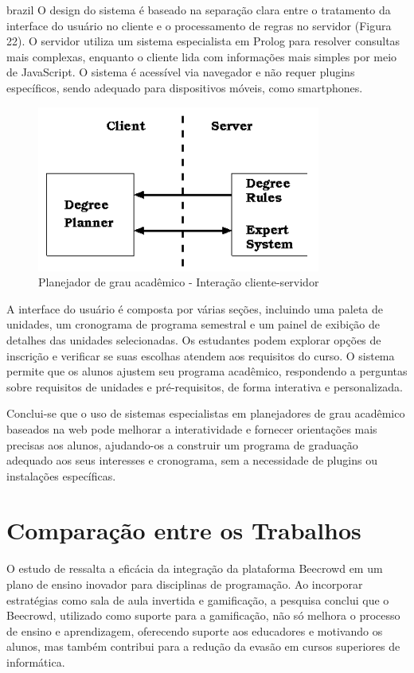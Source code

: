 \begin{otherlanguage*}{brazil}
O design do sistema é baseado na separação clara entre o tratamento da interface do usuário no cliente e o processamento de regras no servidor (Figura 22). O servidor utiliza um sistema especialista em Prolog para resolver consultas mais complexas, enquanto o cliente lida com informações mais simples por meio de JavaScript. O sistema é acessível via navegador e não requer plugins específicos, sendo adequado para dispositivos móveis, como smartphones.

\begin{figure}[h!]
        \centering
         \caption{Planejador de grau acadêmico - Interação cliente-servidor}
         \label{fig:ModeloConceitual}
                \includegraphics[scale=0.5]{pictures/degree_planner_client_server.png}
\end{figure}

A interface do usuário é composta por várias seções, incluindo uma paleta de unidades, um cronograma de programa semestral e um painel de exibição de detalhes das unidades selecionadas. Os estudantes podem explorar opções de inscrição e verificar se suas escolhas atendem aos requisitos do curso. O sistema permite que os alunos ajustem seu programa acadêmico, respondendo a perguntas sobre requisitos de unidades e pré-requisitos, de forma interativa e personalizada.

Conclui-se que o uso de sistemas especialistas em planejadores de grau acadêmico baseados na web pode melhorar a interatividade e fornecer orientações mais precisas aos alunos, ajudando-os a construir um programa de graduação adequado aos seus interesses e cronograma, sem a necessidade de plugins ou instalações específicas.


\section{Comparação entre os Trabalhos}

O estudo de \cite{cruz2022} ressalta a eficácia da integração da plataforma Beecrowd em um plano de ensino inovador para disciplinas de programação. Ao incorporar estratégias como sala de aula invertida e gamificação, a pesquisa conclui que o Beecrowd, utilizado como suporte para a gamificação, não só melhora o processo de ensino e aprendizagem, oferecendo suporte aos educadores e motivando os alunos, mas também contribui para a redução da evasão em cursos superiores de informática.


\end{otherlanguage*}
